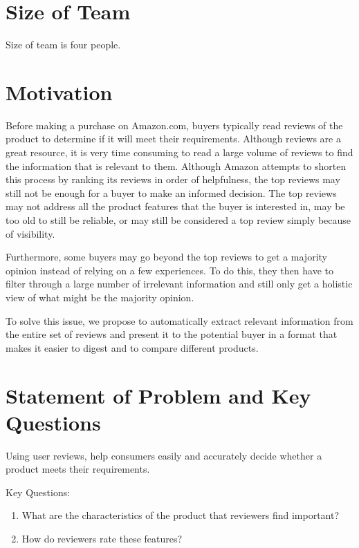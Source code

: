 \documentclass{article}
\begin{document}
 


\section{Size of Team}
Size of team is four people. 

\section{Motivation} 
 
Before making a purchase on Amazon.com, buyers typically read reviews of the product to determine if it will meet their requirements. Although reviews are a great resource, it is very time consuming to read a large volume of reviews to find the information that is relevant to them. Although Amazon attempts to shorten this process by ranking its reviews in order of helpfulness, the top reviews may still not be enough for a buyer to make an informed decision. The top reviews may not address all the product features that the buyer is interested in, may be too old to still be reliable, or may still be considered a top review simply because of visibility. 

Furthermore, some buyers may go beyond the top reviews to get a majority opinion instead of relying on a few experiences. To do this, they then have to filter through a large number of irrelevant information and still only get a holistic view of what might be the majority opinion.

To solve this issue, we propose to automatically extract relevant information from the entire set of reviews and present it to the potential buyer in a format that makes it easier to digest and to compare different products.

\section{Statement of Problem and Key Questions} 

Using user reviews, help consumers easily and accurately decide whether a product meets their requirements. 

Key Questions:

\begin{enumerate}
\item What are the characteristics of the product that reviewers find important?
\item How do reviewers rate these features?
\end{enumerate}
\end{document}
